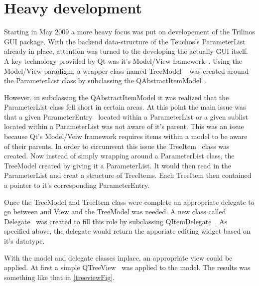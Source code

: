 \section{Heavy development}
Starting in May 2009 a more heavy focus was put on developement of the Trilinos GUI package.
With the backend data-structure of the Teuchos's ParameterList already in place, attention
was turned to the developing the actually GUI itself. A key technology provided by Qt was it's Model/View
framework~\cite{QtModelView}. Using the Model/View paradigm, a wrapper class named TreeModel
~\cite{TreeModel} was created around the ParameterList class by subclassing the 
QAbstractItemModel~\cite{QAbstractItemModel}.

However, in subclassing the QAbstractItemModel it was realized that the ParameterList class fell short in
certain areas. At this point the main issue was that a given ParameterEntry~\cite{ParameterEntry} located within
a ParameterList or a given sublist located within a ParameterList was not aware of it's parent.
This was an issue because Qt's Model/Veiw framework requires items within a model to be aware of
their parents. In order to circumvent this issue the TreeItem~\cite{TreeItem} class was created. Now 
instead of simply wrapping around a ParameterList class, the TreeModel created by giving it a ParameterList.
It would then read in the ParameterList and creat a structure of TreeItems.  Each TreeItem then contained a pointer 
to it's corresponding ParameterEntry.

Once the TreeModel and TreeItem class were complete an appropriate delegate to go between and View
and the TreeModel was needed. A new class called Delegate~\cite{Delegate} was created to fill this
role by subclassing QItemDelegate~\cite{QItemDelegate}. As specified above, the delegate would return
the apporiate editing widget based on it's datatype.

With the model and delegate classes inplace, an appropriate view could be applied. At first a simple
QTreeView~\cite{QTreeView} was applied to the model. The results was something like that in \ref{treeviewFig}.
	\begin{figure}[h]
		\centering
	\end{figure}


